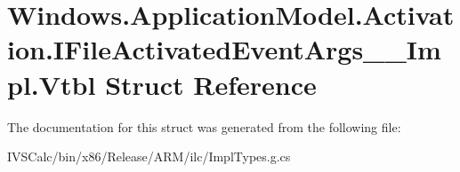 \hypertarget{struct_windows_1_1_application_model_1_1_activation_1_1_i_file_activated_event_args_____impl_1_1_vtbl}{}\section{Windows.\+Application\+Model.\+Activation.\+I\+File\+Activated\+Event\+Args\+\_\+\+\_\+\+Impl.\+Vtbl Struct Reference}
\label{struct_windows_1_1_application_model_1_1_activation_1_1_i_file_activated_event_args_____impl_1_1_vtbl}


The documentation for this struct was generated from the following file\+:\begin{DoxyCompactItemize}
\item 
I\+V\+S\+Calc/bin/x86/\+Release/\+A\+R\+M/ilc/Impl\+Types.\+g.\+cs\end{DoxyCompactItemize}
